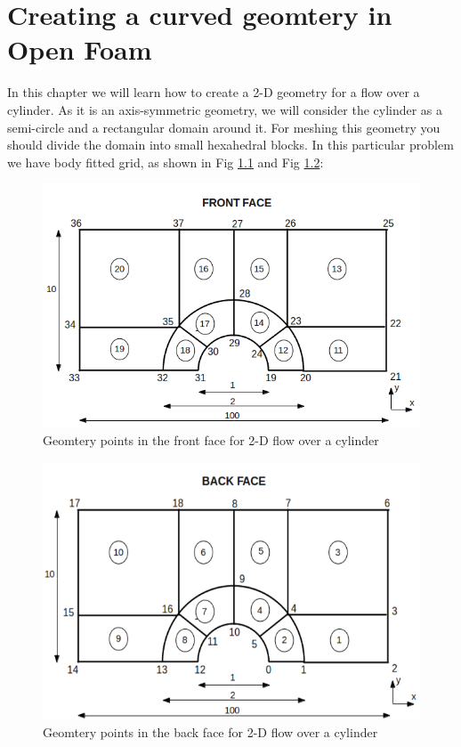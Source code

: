 \documentclass[a4paper,12pt]{report}
\begin{document}
\setcounter{chapter}{2}
\chapter{Creating a curved geomtery in Open Foam}
\flushleft In this chapter we will learn how to create a 2-D geometry for a flow over a cylinder. As it is an axis-symmetric geometry, we will consider the cylinder as a semi-circle and a rectangular domain around it. For meshing this geometry you should divide the domain into small hexahedral blocks. In this particular problem we have body fitted grid, as shown in Fig \ref{frontface} and Fig \ref{backface}{$:$}

\begin{figure}[ht]  
\begin{center}  
\includegraphics[scale=0.6]{frontface.png}
\caption{Geomtery points in the front face for 2-D flow over a cylinder}
\label{frontface}
\end{center}  
\end{figure}

\begin{figure}[ht]  
\begin{center}  
\includegraphics[scale=0.6]{backface.png}
\caption{Geomtery points in the back face for 2-D flow over a cylinder}
\label{backface}
\end{center}  
\end{figure}
\end{document}
